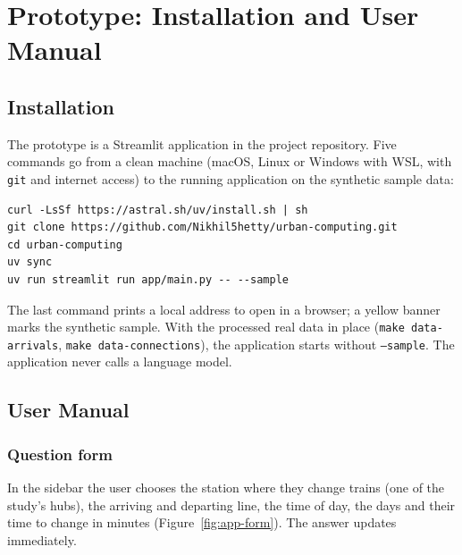 \section{Prototype: Installation and User Manual}
\label{app:prototype}

\subsection{Installation}
\label{app:install}
The prototype is a Streamlit application in the project repository. Five commands go from
a clean machine (macOS, Linux or Windows with WSL, with \texttt{git} and internet access) to
the running application on the synthetic sample data:

\begin{verbatim}
curl -LsSf https://astral.sh/uv/install.sh | sh
git clone https://github.com/Nikhil5hetty/urban-computing.git
cd urban-computing
uv sync
uv run streamlit run app/main.py -- --sample
\end{verbatim}

The last command prints a local address to open in a browser; a yellow banner marks the
synthetic sample. With the processed real data in place (\texttt{make data-arrivals},
\texttt{make data-connections}), the application starts without \texttt{--sample}. The
application never calls a language model.

\subsection{User Manual}
\label{app:manual}

\subsubsection*{Question form} In the sidebar the user chooses the station where they change
trains (one of the study's hubs), the arriving and departing line, the time of day, the days
and their time to change in minutes (Figure~\ref{fig:app-form}). The answer updates
immediately.

